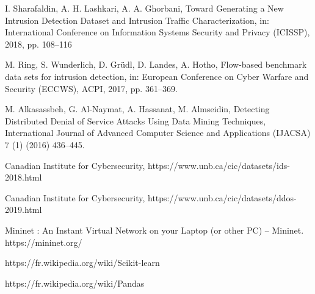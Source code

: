 \begin{thebibliography}{9}
\bibitem{}
I. Sharafaldin, A. H. Lashkari, A. A. Ghorbani, Toward Generating a New Intrusion Detection Dataset and Intrusion Traffic Characterization, in: International Conference on Information Systems Security and Privacy (ICISSP), 2018, pp. 108–116

\bibitem{}
M. Ring, S. Wunderlich, D. Grüdl, D. Landes, A. Hotho, Flow-based benchmark data sets for intrusion detection, in: European Conference on Cyber Warfare and Security (ECCWS), ACPI, 2017, pp. 361–369.

\bibitem{}
M. Alkasassbeh, G. Al-Naymat, A. Hassanat, M. Almseidin, Detecting Distributed Denial of Service Attacks Using Data Mining Techniques, International Journal of Advanced Computer Science and Applications (IJACSA) 7 (1) (2016) 436–445.

\bibitem{}
Canadian Institute for Cybersecurity, https://www.unb.ca/cic/datasets/ids-2018.html

\bibitem{}
Canadian Institute for Cybersecurity, https://www.unb.ca/cic/datasets/ddos-2019.html

\bibitem{}
Mininet : An Instant Virtual Network on your Laptop (or other PC) – Mininet. https://mininet.org/

\bibitem{}
https://fr.wikipedia.org/wiki/Scikit-learn

\bibitem{}
https://fr.wikipedia.org/wiki/Pandas
\end{thebibliography}